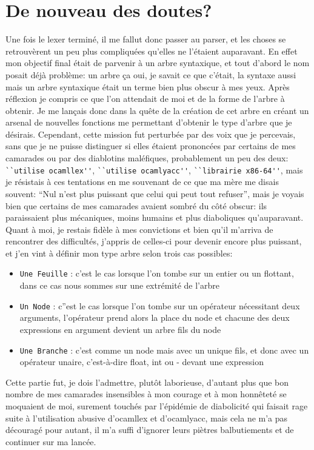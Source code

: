 \documentclass{report}
\begin{document}
\section{De nouveau des doutes?}
Une fois le lexer terminé, il me fallut donc passer au parser, et
les choses se retrouvèrent un peu plus compliquées qu'elles ne l'étaient auparavant. En effet mon objectif final était de parvenir à un arbre syntaxique, 
et tout d'abord le nom posait déjà problème: un arbre ça oui, 
je savait ce que c'était, la syntaxe aussi mais un 
arbre syntaxique était un terme bien plus obscur à mes yeux. 
Après réflexion je compris ce que l'on attendait de moi et de la forme de l'arbre à obtenir. 
Je me lançais donc dans la quête de la création de cet arbre en créant un arsenal de nouvelles fonctions me permettant d'obtenir le type d'arbre que je désirais. Cependant, cette mission fut perturbée par des voix que je percevais, sans que je ne puisse distinguer si elles étaient prononcées par certains de mes camarades ou par des diablotins maléfiques, probablement un peu des deux: \verb|``utilise ocamllex''|, \verb|``utilise ocamlyacc''|, \verb|``librairie x86-64''|, mais je résistais à ces tentations en me souvenant de ce que ma mère me disais souvent: ``Nul n'est plus puissant que celui qui peut tout refuser'', mais je voyais bien que certains de mes camarades avaient sombré du côté obscur: ils paraissaient plus mécaniques, moins humains et plus diaboliques qu'auparavant.
Quant à moi, je restais fidèle à mes convictions et bien qu'il m'arriva de rencontrer des difficultés, j'appris de celles-ci pour devenir encore plus puissant, et j'en vint à définir mon type arbre selon trois cas possibles:
\begin{itemize}
 \item \verb|Une Feuille| : c'est le cas lorsque l'on tombe sur un entier ou un flottant, dans ce cas nous sommes sur une extrémité de l'arbre
 \item \verb|Un Node| : c''est le cas lorsque l'on tombe sur un opérateur nécessitant deux arguments, l'opérateur prend alors la place du node et chacune des deux expressions en argument devient un arbre fils du node
 \item \verb|Une Branche| : c'est comme un node mais avec un unique fils, et donc avec un opérateur unaire, c'est-à-dire float, int ou - devant une expression
\end{itemize}
Cette partie fut, je dois l'admettre, plutôt laborieuse, d'autant plus que bon nombre de mes camarades insensibles à mon courage et à mon honnêteté se moquaient de moi, surement touchés par l'épidémie de diabolicité qui faisait rage suite à l'utilisation abusive d'ocamllex et d'ocamlyacc, mais cela ne m'a pas découragé pour autant, il m'a suffi d'ignorer leurs piètres balbutiements et de continuer sur ma lancée.
\end{document}
